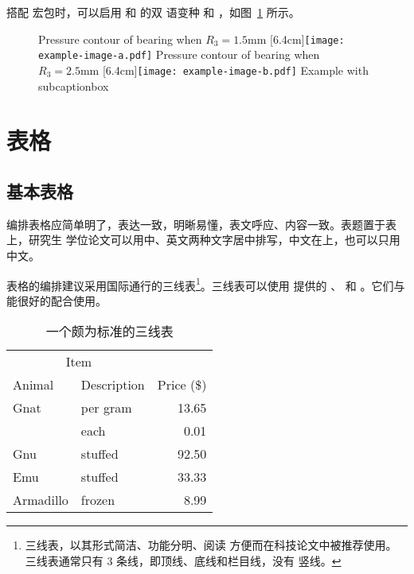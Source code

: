 \documentclass{sjtureport}
\begin{document}
搭配  宏包时，可以启用  和  的双
语变种  和 ，如图~\ref{fig:bisubcaptionbox}
所示。

\begin{figure}[!hbtp]
	\centering
	{Pressure contour of bearing when $R_3 = 1.5\text{mm}$}%
	[6.4cm]{\texttt{[image: example-image-a.pdf]}}
	\hspace{1cm}
	{Pressure contour of bearing when $R_3 = 2.5\text{mm}$}%
	[6.4cm]{\texttt{[image: example-image-b.pdf]}}
	{Example with subcaptionbox}
	\label{fig:bisubcaptionbox}
\end{figure}


\section{表格}

\subsection{基本表格}

编排表格应简单明了，表达一致，明晰易懂，表文呼应、内容一致。表题置于表上，研究生
学位论文可以用中、英文两种文字居中排写，中文在上，也可以只用中文。

表格的编排建议采用国际通行的三线表\footnote{三线表，以其形式简洁、功能分明、阅读
方便而在科技论文中被推荐使用。三线表通常只有 3 条线，即顶线、底线和栏目线，没有
竖线。}。三线表可以使用  提供的 、 和
。它们与  能很好的配合使用。

\begin{table}[!hpt]
	\caption[一个颇为标准的三线表]{一个颇为标准的三线表\footnotemark}
	\label{tab:firstone}
	\centering
	\begin{tabular}{@{}llr@{}} \toprule
		\multicolumn{2}{c}{Item}             \\ \cmidrule(r){1-2}
		Animal    & Description & Price (\$) \\ \midrule
		Gnat      & per gram    & 13.65      \\
		          & each        & 0.01       \\
		Gnu       & stuffed     & 92.50      \\
		Emu       & stuffed     & 33.33      \\
		Armadillo & frozen      & 8.99       \\ \bottomrule
	\end{tabular}
\end{table}
\end{document}
